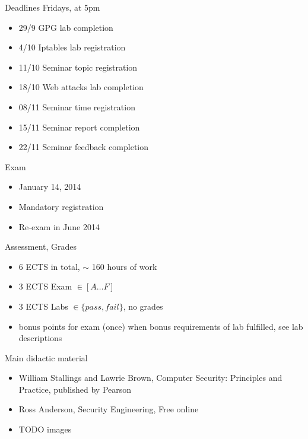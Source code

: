 \documentclass{beamer}
\newcommand{\todo}[1]{\alert{TODO #1}}
\begin{document}
\begin{frame}{Deadlines}
  Fridays, at 5pm
  \begin{itemize}
  \item 29/9 GPG lab completion 
  \item 4/10 Iptables lab registration 
  \item 11/10 Seminar topic registration 
  \item 18/10 Web attacks lab completion 
  \item 08/11 Seminar time registration 
  \item 15/11 Seminar report completion 
  \item 22/11 Seminar feedback completion 
  \end{itemize}
\end{frame}

\begin{frame}{Exam}
  \begin{itemize}
  \item January 14, 2014
  \item \alert{Mandatory} registration 
  \item Re-exam in June 2014
  \end{itemize}
\end{frame}

\begin{frame}{Assessment, Grades}
  \begin{itemize}
  \item 6 ECTS in total, $\sim$ 160 hours of work 
  \item 3 ECTS Exam $\in [A \dots F]$
  \item 3 ECTS Labs $\in \{pass,fail\}$, no grades
  \item bonus points for exam (once) when bonus 
    requirements of lab fulfilled, see lab descriptions
  \end{itemize}
\end{frame}

\begin{frame}{Main didactic material}
  \begin{itemize}
  \item William Stallings and Lawrie Brown, Computer Security:
    Principles and Practice, published by Pearson 
  \item Ross Anderson, Security Engineering, Free online
  \item \todo{images}
  \end{itemize}
\end{frame}
\end{document}

